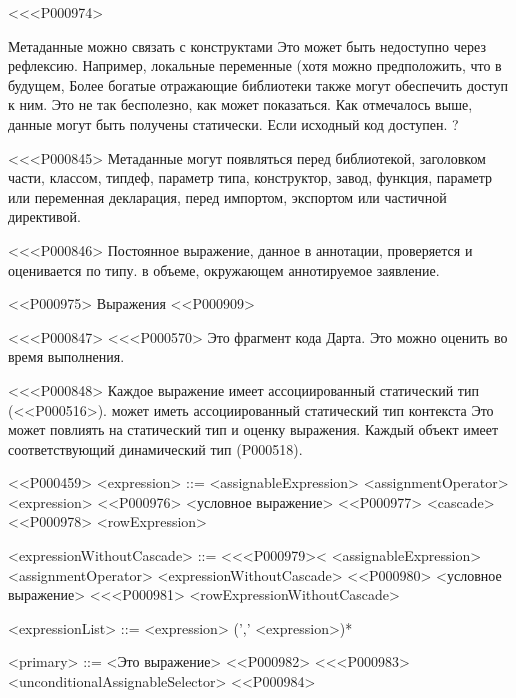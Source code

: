 {{{{{{{{{<<<P000974>{%
Метаданные можно связать с конструктами
Это может быть недоступно через рефлексию.
Например, локальные переменные
(хотя можно предположить, что в будущем,
Более богатые отражающие библиотеки также могут обеспечить доступ к ним.
Это не так бесполезно, как может показаться.
Как отмечалось выше, данные могут быть получены статически.
Если исходный код доступен.%
?

<<<P000845>%
Метаданные могут появляться перед библиотекой, заголовком части, классом,
типдеф, параметр типа, конструктор, завод, функция,
параметр или переменная декларация,
перед импортом, экспортом или частичной директивой.

<<<P000846>%
Постоянное выражение, данное в аннотации, проверяется и оценивается по типу.
в объеме, окружающем аннотируемое заявление.


<<P000975> Выражения
<<P000909>

<<<P000847>%
<<<P000570> Это фрагмент кода Дарта.
Это можно оценить во время выполнения.

<<<P000848>%
Каждое выражение имеет ассоциированный статический тип (<<P000516>).
может иметь ассоциированный статический тип контекста
Это может повлиять на статический тип и оценку выражения.
Каждый объект имеет соответствующий динамический тип (P000518).


<<P000459>
<expression> ::= <assignableExpression> <assignmentOperator> <expression>
<<P000976> <условное выражение>
<<P000977> <cascade>
<<P000978> <rowExpression>

<expressionWithoutCascade> ::= <<<P000979><
<assignableExpression> <assignmentOperator> <expressionWithoutCascade>
<<P000980> <условное выражение>
<<<P000981> <rowExpressionWithoutCascade>

<expressionList> ::= <expression> (',' <expression>)*

<primary> ::= <Это выражение>
<<P000982> <<<P000983>{} <unconditionalAssignableSelector>
<<P000984> }}}}}}}}}}

